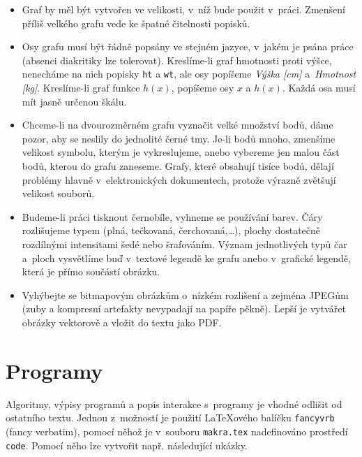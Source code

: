 \begin{itemize}
\item Graf by měl být vytvořen ve velikosti, v~níž bude použit
  v~práci. Zmenšení příliš velkého grafu vede ke špatné čitelnosti
  popisků.
\item Osy grafu musí být řádně popsány ve stejném jazyce, v~jakém je
  psána práce (absenci diakritiky lze tolerovat). Kreslíme-li graf
  hmotnosti proti výšce, nenecháme na nich popisky \texttt{ht} a
  \texttt{wt}, ale osy popíšeme \emph{Výška [cm]} a~\emph{Hmotnost
    [kg]}. Kreslíme-li graf funkce $h(x)$, popíšeme osy $x$ a $h(x)$.
  Každá osa musí mít jasně určenou škálu.
\item Chceme-li na dvourozměrném grafu vyznačit velké množství bodů,
  dáme pozor, aby se neslily do jednolité černé tmy. Je-li bodů mnoho,
  zmenšíme velikost symbolu, kterým je vykreslujeme, anebo vybereme
  jen malou část bodů, kterou do grafu zaneseme. Grafy, které obsahují
  tisíce bodů, dělají problémy hlavně v~elektronických dokumentech,
  protože výrazně zvětšují velikost souborů.
\item Budeme-li práci tisknout černobíle, vyhneme se používání barev.
  Čáry roz\-li\-šu\-je\-me typem (plná, tečkovaná, čerchovaná,\ldots), plochy
  dostatečně roz\-díl\-ný\-mi intensitami šedé nebo šrafováním. Význam
  jednotlivých typů čar a~ploch vysvětlíme buď v~textové legendě ke
  grafu anebo v~grafické legendě, která je přímo součástí obrázku.
\item Vyhýbejte se bitmapovým obrázkům o~nízkém rozlišení a zejména
  JPEGům (zuby a kompresní artefakty nevypadají na papíře pěkně).
  Lepší je vytvářet obrázky vektorově a vložit do textu jako PDF.
\end{itemize}

\section{Programy}

Algoritmy, výpisy programů a popis interakce s~programy je vhodné
odlišit od ostatního textu. Jednou z~možností je použití {\LaTeX}o\-vé\-ho balíčku
\texttt{fancyvrb} (fancy verbatim), pomocí něhož je v~souboru \texttt{makra.tex}
nadefinováno prostředí \texttt{code}. Pomocí něho lze vytvořit
např. následující ukázky.

